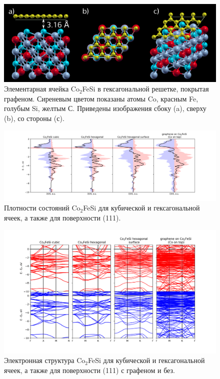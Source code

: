 \begin{figure}[h]
    \centering
    \includegraphics[scale=0.6]{images/sico_cell.png}
    \caption{Элементарная ячейка Co$_2$FeSi в гексагональной решетке, покрытая графеном. Сиреневым цветом показаны атомы Co, красным Fe, голубым Si, желтым С. Приведены изображения сбоку (a), сверху (b), со стороны (с). }
    \label{fig:graphene-cofe-cell}
\end{figure}

\begin{figure}[h]
    \centering
    \includegraphics[scale=0.5]{images/070920_dos.png}
    \caption{Плотности состояний Co$_2$FeSi для кубической и гексагональной ячеек, а также для поверхности (111). }
    \label{fig:dos}
\end{figure}

\begin{figure}[h]
    \centering
    \includegraphics[scale=0.65]{images/070920_bands3.png}
    \caption{Электронная структура Co$_2$FeSi для кубической и гексагональной ячеек, а также для поверхности (111) с графеном и без. }
    \label{fig:bands}
\end{figure}

